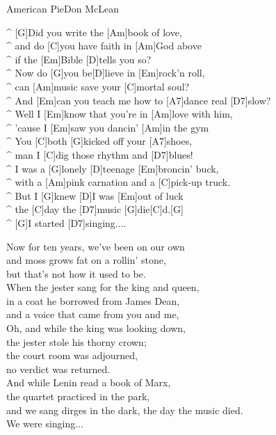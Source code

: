 \begin{song}{American Pie}{Don McLean}
\begin{guitar}
^ [G]Did you write the [Am]book of love, \\
^ and do [C]you have faith in [Am]God above \\
^ if the [Em]Bible [D]tells you so? \\
^ Now do [G]you be[D]lieve in [Em]rock'n roll,  \\
^ can [Am]music save your [C]mortal soul?  \\
^ And [Em]can you teach me how to [A7]dance real [D7]slow?\\
^ Well I [Em]know that you're in [Am]love with him, \\
^ 'cause I [Em]saw you dancin' [Am]in the gym\\
^ You [C]both [G]kicked off your [A7]shoes, \\
^ man I [C]dig those rhythm and [D7]blues!\\
^ I was a [G]lonely [D]teenage [Em]broncin' buck, \\
^ with a [Am]pink carnation and a [C]pick-up truck.\\
^ But I [G]knew [D]I was [Em]out of luck \\
^ the [C]day the [D7]music [G]die[C]d.[G] \\
^ [G]I started [D7]singing....     \\
\end{guitar}


\begin{guitar}
Now for ten years, we've been on our own \\
and moss grows fat on a rollin' stone,\\
but that's not how it used to be. \\
When the jester sang for the king and queen, \\ 
in a coat he borrowed from James Dean, \\
and a voice that came from you and me, \\
Oh, and while the king was looking down, \\
the jester stole his thorny crown;\\
the court room was adjourned, \\
no verdict was returned.\\
And while Lenin read a book of Marx, \\
the quartet practiced in the park, \\
and we sang dirges in the dark, 
the day the music died. \\
We were singing... \\
\end{guitar}


\end{song}
